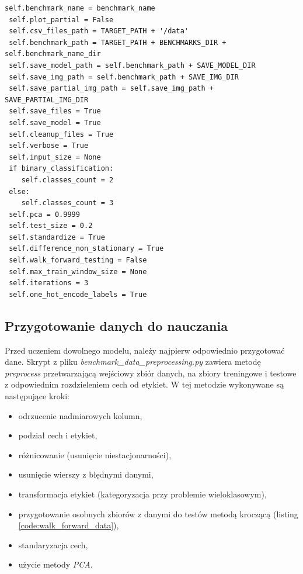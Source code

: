 \documentclass[a4paper, twoside, 11pt, openright]{article}
\begin{document}
\begin{lstlisting}[caption={Parametry z klasy \textit{BenchmarkParams} (plik \textit{benchmark\_params.py}).}, label={code:params},frame=single, captionpos=b, mathescape=true]
 self.benchmark_name = benchmark_name
 self.plot_partial = False
 self.csv_files_path = TARGET_PATH + '/data'
 self.benchmark_path = TARGET_PATH + BENCHMARKS_DIR + self.benchmark_name_dir
 self.save_model_path = self.benchmark_path + SAVE_MODEL_DIR
 self.save_img_path = self.benchmark_path + SAVE_IMG_DIR
 self.save_partial_img_path = self.save_img_path + SAVE_PARTIAL_IMG_DIR
 self.save_files = True
 self.save_model = True
 self.cleanup_files = True
 self.verbose = True
 self.input_size = None
 if binary_classification:
    self.classes_count = 2
 else:
    self.classes_count = 3
 self.pca = 0.9999
 self.test_size = 0.2
 self.standardize = True
 self.difference_non_stationary = True
 self.walk_forward_testing = False
 self.max_train_window_size = None
 self.iterations = 3
 self.one_hot_encode_labels = True
\end{lstlisting}

\subsection*{Przygotowanie danych do nauczania}

Przed uczeniem dowolnego modelu, należy najpierw odpowiednio przygotować dane. Skrypt z pliku \textit{benchmark\_data\_preprocessing.py} zawiera metodę \textit{preprocess} przetwarzającą wejściowy zbiór danych, na zbiory treningowe i testowe z odpowiednim rozdzieleniem cech od etykiet. W tej metodzie wykonywane są następujące kroki:
\begin{itemize}
\item odrzucenie nadmiarowych kolumn,
\item podział cech i etykiet,
\item różnicowanie (usunięcie niestacjonarności),
\item usunięcie wierszy z błędnymi danymi,
\item transformacja etykiet (kategoryzacja przy problemie wieloklasowym),
\item przygotowanie osobnych zbiorów z danymi do testów metodą kroczącą (listing \ref{code:walk_forward_data}),
\item standaryzacja cech,
\item użycie metody \textit{PCA}.
\end{itemize}
\end{document}
